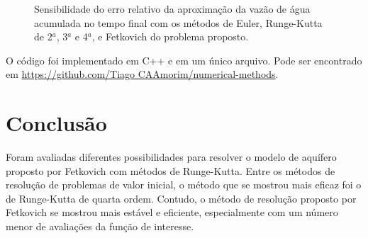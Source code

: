 \documentclass[final,5p]{elsarticle}
\numberwithin{equation}{section}
\begin{document}
        \begin{figure}[hbt!]
            \caption{Sensibilidade do erro relativo da aproximação da vazão de água acumulada no tempo final com os métodos de Euler, Runge-Kutta de 2$^a$, 3$^a$ e 4$^a$, e Fetkovich do problema proposto.}
            \label{fig:testeaq1sensrk}
        \end{figure}

        O código foi implementado em C++ e em um único arquivo. Pode ser encontrado em \href{https://github.com/TiagoCAAmorim/numerical-methods/blob/main/07_RungeKutta/07_RungeKutta.cpp}{https://github.com/Tiago CAAmorim/numerical-methods}.

    \section{Conclusão}

        Foram avaliadas diferentes possibilidades para resolver o modelo de aquífero proposto por Fetkovich com métodos de Runge-Kutta. Entre os métodos de resolução de problemas de valor inicial, o método que se mostrou mais eficaz foi o de Runge-Kutta de quarta ordem. Contudo, o método de resolução proposto por Fetkovich se mostrou mais estável e eficiente, especialmente com um número menor de avaliações da função de interesse.
\end{document}
